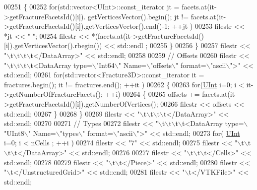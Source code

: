 \begin{DoxyCode}
00251         \{
00252             \textcolor{keywordflow}{for}(std::vector<UInt>::const\_iterator jt = facets.at(it->getFractureFacetsId()[i]).
      getVerticesVector().begin(); jt != facets.at(it->getFractureFacetsId()[i]).getVerticesVector().end()-1; ++jt )
00253                 filestr << *jt << \textcolor{stringliteral}{" "};
00254             filestr << *(facets.at(it->getFractureFacetsId()[i]).getVerticesVector().rbegin()) << std::endl
      ;
00255         \}
00256     \}
00257     filestr << \textcolor{stringliteral}{"\(\backslash\)t\(\backslash\)t\(\backslash\)t\(\backslash\)t</DataArray>"} << std::endl;
00258 
00259     \textcolor{comment}{//  Offsets}
00260     filestr << \textcolor{stringliteral}{"\(\backslash\)t\(\backslash\)t\(\backslash\)t\(\backslash\)t<DataArray type=\(\backslash\)"Int64\(\backslash\)" Name=\(\backslash\)"offsets\(\backslash\)" format=\(\backslash\)"ascii\(\backslash\)">"} << std::endl;
00261     \textcolor{keywordflow}{for}(std::vector<Fracture3D>::const\_iterator it = fractures.begin(); it != fractures.end(); ++it )
00262     \{
00263         \textcolor{keywordflow}{for}(\hyperlink{namespaceFVCode3D_a4bf7e328c75d0fd504050d040ebe9eda}{UInt} i=0; i < it->getNumberOfFractureFacets(); ++i)
00264         \{
00265             offsets += facets.at(it->getFractureFacetsId()[i]).getNumberOfVertices();
00266             filestr << offsets << std::endl;
00267         \}
00268     \}
00269     filestr << \textcolor{stringliteral}{"\(\backslash\)t\(\backslash\)t\(\backslash\)t\(\backslash\)t</DataArray>"} << std::endl;
00270 
00271     \textcolor{comment}{//  Types}
00272     filestr << \textcolor{stringliteral}{"\(\backslash\)t\(\backslash\)t\(\backslash\)t\(\backslash\)t<DataArray type=\(\backslash\)"UInt8\(\backslash\)" Name=\(\backslash\)"types\(\backslash\)" format=\(\backslash\)"ascii\(\backslash\)">"} << std::endl;
00273     \textcolor{keywordflow}{for}( \hyperlink{namespaceFVCode3D_a4bf7e328c75d0fd504050d040ebe9eda}{UInt} i=0; i < nCells ; ++i )
00274         filestr << \textcolor{stringliteral}{"7"} << std::endl;
00275     filestr << \textcolor{stringliteral}{"\(\backslash\)t\(\backslash\)t\(\backslash\)t\(\backslash\)t</DataArray>"} << std::endl;
00276 
00277     filestr << \textcolor{stringliteral}{"\(\backslash\)t\(\backslash\)t\(\backslash\)t</Cells>"} << std::endl;
00278 
00279     filestr << \textcolor{stringliteral}{"\(\backslash\)t\(\backslash\)t</Piece>"} << std::endl;
00280     filestr << \textcolor{stringliteral}{"\(\backslash\)t</UnstructuredGrid>"} << std::endl;
00281     filestr << \textcolor{stringliteral}{"\(\backslash\)t</VTKFile>"} << std::endl;

\end{DoxyCode}
